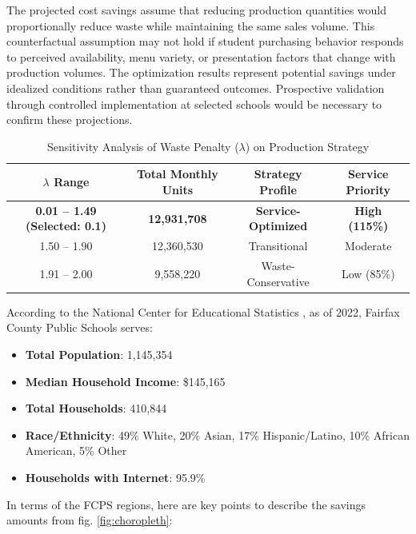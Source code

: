 \documentclass[journal]{IEEEtran}
\begin{document}
The projected cost savings assume that reducing production quantities would proportionally reduce waste while maintaining the same sales volume. This counterfactual assumption may not hold if student purchasing behavior responds to perceived availability, menu variety, or presentation factors that change with production volumes. The optimization results represent potential savings under idealized conditions rather than guaranteed outcomes. Prospective validation through controlled implementation at selected schools would be necessary to confirm these projections.

\begin{table}[h]
\centering
\caption{Sensitivity Analysis of Waste Penalty ($\lambda$) on Production Strategy}
\label{tab:lambda_sensitivity}
\begin{tabular}{@{}cccc@{}}
\toprule
\textbf{$\lambda$ Range} & \textbf{Total Monthly Units} & \textbf{Strategy Profile} & \textbf{Service Priority} \\ \midrule
\textbf{0.01 -- 1.49 (Selected: 0.1)} & \textbf{12,931,708} & \textbf{Service-Optimized} & \textbf{High (115\%)} \\
1.50 -- 1.90 & 12,360,530 & Transitional & Moderate \\
1.91 -- 2.00 & 9,558,220 & Waste-Conservative & Low (85\%) \\ \bottomrule
\end{tabular}
\end{table}

According to the National Center for Educational Statistics \cite{fcpsdemo}, as of 2022, Fairfax County Public Schools serves:

\begin{itemize}
    \item \textbf{Total Population}: 1,145,354
    \item \textbf{Median Household Income}: \$145,165
    \item \textbf{Total Households}: 410,844
    \item \textbf{Race/Ethnicity}: 49\% White, 20\% Asian, 17\% Hispanic/Latino, 10\% African American, 5\% Other
    \item \textbf{Households with Internet}: 95.9\%
\end{itemize}

In terms of the FCPS regions, here are key points to describe the savings amounts from fig. \ref{fig:choropleth}:
\end{document}
